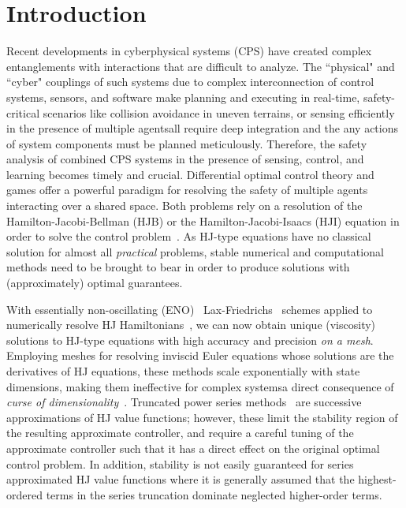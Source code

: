 \section{Introduction}

Recent developments in cyberphysical systems (CPS) have created complex entanglements with interactions that are difficult to analyze.
The ``physical" and ``cyber" couplings of such systems due to complex interconnection of control systems, sensors, and software make planning and executing in real-time, safety-critical scenarios like collision avoidance in uneven terrains, or sensing efficiently in the presence of multiple agents\textemdash all require deep integration and the any actions of system components must be planned meticulously. 
Therefore, the safety analysis of combined CPS systems in the presence of sensing, control, and learning becomes timely and crucial.
Differential optimal control theory and games offer a powerful paradigm for resolving the safety of multiple agents interacting over a shared space. 
Both problems rely on a resolution of the Hamilton-Jacobi-Bellman (HJB) or the Hamilton-Jacobi-Isaacs (HJI) equation in order to solve the control problem~\cite{++}.  
As HJ-type equations have no classical solution for almost all \textit{practical} problems, stable numerical and computational methods need to be brought to bear in order to produce solutions with (approximately) optimal guarantees. 

With essentially non-oscillating (ENO)~\cite{OsherShuENO} Lax-Friedrichs~\cite{CrandallLaxFriedrichs} schemes applied to numerically resolve HJ Hamiltonians~\cite{Evans1984}, we can now obtain unique (viscosity) solutions to HJ-type equations with high accuracy and precision \textit{on a mesh}. 
Employing meshes for resolving inviscid Euler equations whose solutions are the derivatives of HJ equations, these methods scale exponentially with state dimensions, making them ineffective for complex systems\textemdash a direct consequence of \textit{curse of dimensionality}~\cite{Bellman1957}. 
Truncated power series methods~\cite{Jacobson1968new, JacobsonMayne, DenhamDDP, TodorovCDC} are successive approximations of HJ value functions; however, these limit the stability region of the resulting approximate controller, and require a careful tuning of the approximate controller such that it has a direct effect on the original optimal control problem.  
In addition, stability is not easily guaranteed for series approximated HJ value functions where it is generally assumed that the highest-ordered terms in the series truncation dominate neglected higher-order terms.


